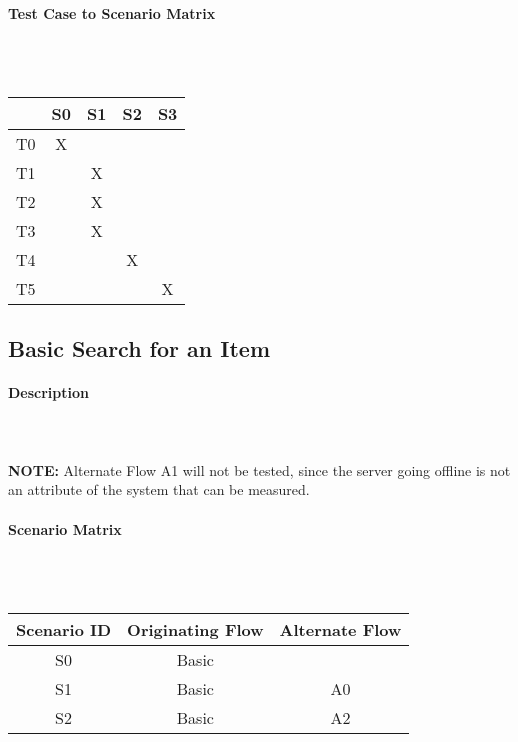 \documentclass{article}
\begin{document}
\paragraph{Test Case to Scenario Matrix}~\\ \\
\begin{tabular}{ | c || c | c | c | c | }
\hline
    & S0 & S1 & S2 & S3\\
\hline
\hline
T0 & X  &    &    &    \\
\hline
T1 &    & X  &    &    \\
\hline
T2 &    & X  &    &    \\
\hline
T3 &    & X  &    &    \\
\hline
T4 &    &    & X  &    \\
\hline
T5 &    &    &    & X  \\
\hline
\end{tabular}

\subsection{Basic Search for an Item}
\paragraph{Description}
~\\ \\
\textbf{NOTE:} Alternate Flow A1 will not be tested, since the server going offline is not an attribute of the system that can be measured.

\paragraph{Scenario Matrix}~\\ \\
\begin{tabular}{ c  c  c }
\hline
Scenario ID & Originating Flow & Alternate Flow\\
\hline
\hline
S0 & Basic &  \\
\hline
S1 & Basic & A0 \\
\hline
S2 & Basic & A2 \\
\hline
\end{tabular}\\
~\\
~\\
\end{document}
